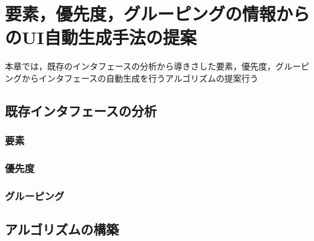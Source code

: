 \chapter{要素，優先度，グルーピングの情報からのUI自動生成手法の提案}
\label{chap:auto-gen}

本章では，既存のインタフェースの分析から導きさした要素，優先度，グルーピングからインタフェースの自動生成を行うアルゴリズムの提案行う
\section{既存インタフェースの分析}

\subsection{要素}

\subsection{優先度}

\subsection{グルーピング}

\section{アルゴリズムの構築}
